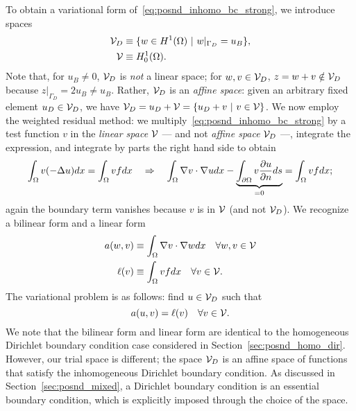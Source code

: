 To obtain a variational form of~\eqref{eq:posnd_inhomo_bc_strong}, we introduce spaces
\begin{align*}
  \mathcal{V}_D &\equiv \{ w \in H^1(\Omega) \ | \ w|_{\Gamma_D} = u_B \}, \\
  \mathcal{V} &\equiv H^1_0(\Omega).
\end{align*}
Note that, for $u_B \neq 0$, $\mathcal{V}_D$ is \emph{not} a linear space; for $w,v \in \mathcal{V}_D$, $z = w + v \notin \mathcal{V}_D$ because $z|_{\Gamma_D} = 2 u_B \neq u_B$. Rather, $\mathcal{V}_D$ is an \emph{affine space}: given an arbitrary fixed element $u_D \in \mathcal{V}_D$, we have $\mathcal{V}_D = u_D + \mathcal{V} = \{ u_D + v \ | \ v \in \mathcal{V} \}$. We now employ the weighted residual method: we multiply~\eqref{eq:posnd_inhomo_bc_strong} by a test function $v$ in the \emph{linear space} $\mathcal{V}$ --- and not \emph{affine space} $\mathcal{V}_D$ ---, integrate the expression, and integrate by parts the right hand side to obtain
\begin{equation*}
  \int_{\Omega} v(-\Delta u) dx = \int_\Omega vf dx
  \quad \Rightarrow \quad
  \int_\Omega \nabla v \cdot \nabla u dx - \underbrace{ \int_{\partial \Omega} v \frac{\partial u}{\partial n} ds }_{= 0}
  = \int_\Omega v f dx;
\end{equation*}
again the boundary term vanishes because $v$ is in $\mathcal{V}$ (and not $\mathcal{V}_D$). 
We recognize a bilinear form and a linear form
\begin{align*}
  a(w,v) &\equiv \int_\Omega \nabla v \cdot \nabla w dx \quad \forall w,v \in \mathcal{V} \\
  \ell(v) &\equiv \int_\Omega vf dx \quad \forall v \in \mathcal{V}.
\end{align*}
The variational problem is as follows: find $u \in \mathcal{V}_D$ such that
\begin{equation}
  a(u,v) = \ell(v) \quad \forall v \in \mathcal{V}.
  \label{eq:posnd_inhomo_bc_var}
\end{equation}
We note that the bilinear form and linear form are identical to the homogeneous Dirichlet boundary condition case considered in Section~\ref{sec:posnd_homo_dir}.  However, our trial space is different; the space $\mathcal{V}_D$ is an affine space of functions that satisfy the inhomogeneous Dirichlet boundary condition.  As discussed in Section~\ref{sec:posnd_mixed}, a Dirichlet boundary condition is an essential boundary condition, which is explicitly imposed through the choice of the space. %

